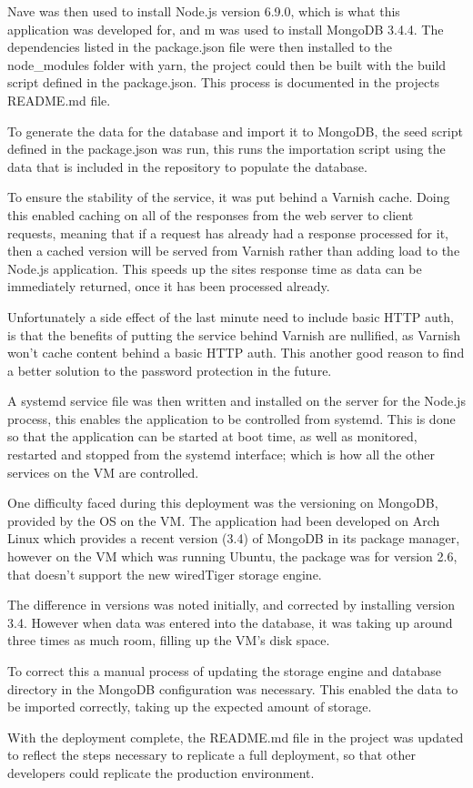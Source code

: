 Nave was then used to install Node.js version 6.9.0, which is what this application was developed for, and m was used to install MongoDB 3.4.4. The dependencies listed in the package.json file were then installed to the node\_modules folder with yarn, the project could then be built with the build script defined in the package.json. This process is documented in the projects README.md file.

To generate the data for the database and import it to MongoDB, the seed script defined in the package.json was run, this runs the importation script using the data that is included in the repository to populate the database.

To ensure the stability of the service, it was put behind a Varnish\cite{varnish} cache. Doing this enabled caching on all of the responses from the web server to client requests, meaning that if a request has already had a response processed for it, then a cached version will be served from Varnish rather than adding load to the Node.js application. This speeds up the sites response time as data can be immediately returned, once it has been processed already.

Unfortunately a side effect of the last minute need to include basic HTTP auth, is that the benefits of putting the service behind Varnish are nullified, as Varnish won't cache content behind a basic HTTP auth. This another good reason to find a better solution to the password protection in the future.

A systemd\cite{systemd} service file was then written and installed on the server for the Node.js process, this enables the application to be controlled from systemd. This is done so that the application can be started at boot time, as well as monitored, restarted and stopped from the systemd interface; which is how all the other services on the VM are controlled.

One difficulty faced during this deployment was the versioning on MongoDB, provided by the OS on the VM. The application had been developed on Arch Linux which provides a recent version (3.4) of MongoDB in its package manager, however on the VM which was running Ubuntu, the package was for version 2.6, that doesn't support the new wiredTiger\cite{tiger} storage engine. 

The difference in versions was noted initially, and corrected by installing version 3.4. However when data was entered into the database, it was taking up around three times as much room, filling up the VM's disk space. 

To correct this a manual process of updating the storage engine and database directory in the MongoDB configuration was necessary. This enabled the data to be imported correctly, taking up the expected amount of storage. 

With the deployment complete, the README.md file in the project was updated to reflect the steps necessary to replicate a full deployment, so that other developers could replicate the production environment. 
